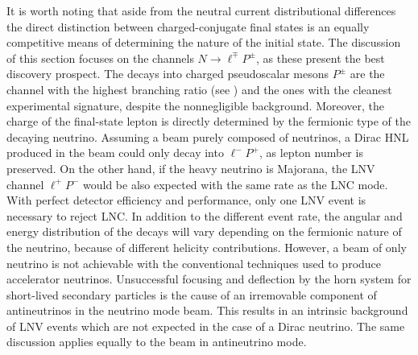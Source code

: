 It is worth noting that aside from the neutral current distributional differences %
the direct distinction between charged-conjugate final states is an equally competitive means of determining the nature of the initial state.
The discussion of this section focuses on the channels $N \to \ell^\mp P^\pm$, %
as these present the best discovery prospect.
The decays into charged pseudoscalar mesons $P^\pm$ are the channel with the highest branching ratio (see ) %
and the ones with the cleanest experimental signature, despite the nonnegligible background.
Moreover, the charge of the final-state lepton is directly determined by the fermionic type of the decaying neutrino.
Assuming a beam purely composed of neutrinos, a Dirac HNL produced in the beam could only decay into $\ell^- P^+$, %
as lepton number is preserved.
On the other hand, if the heavy neutrino is Majorana, the LNV channel $\ell^+ P^-$ %
would be also expected with the same rate as the LNC mode.
With perfect detector efficiency and performance, only one LNV event is necessary to reject LNC.
In addition to the different event rate, the angular and energy distribution of the decays will vary %
depending on the fermionic nature of the neutrino, because of different helicity contributions.
However, a beam of only neutrino is not achievable with %
the conventional techniques used to produce accelerator neutrinos.
Unsuccessful focusing and deflection by the horn system for short-lived secondary particles is the cause %
of an irremovable component of antineutrinos in the neutrino mode beam. %
This results in an intrinsic background of LNV events which are not expected in the case of a Dirac neutrino.
The same discussion applies equally to the beam in antineutrino mode.


